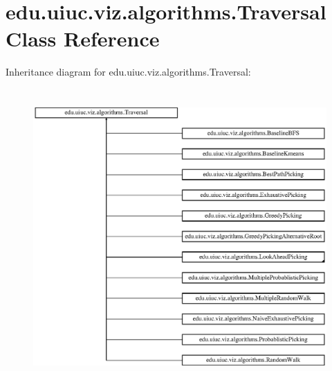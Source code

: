 \hypertarget{classedu_1_1uiuc_1_1viz_1_1algorithms_1_1_traversal}{}\section{edu.\+uiuc.\+viz.\+algorithms.\+Traversal Class Reference}
\label{classedu_1_1uiuc_1_1viz_1_1algorithms_1_1_traversal}
Inheritance diagram for edu.\+uiuc.\+viz.\+algorithms.\+Traversal\+:\begin{figure}[H]
\begin{center}
\leavevmode
\includegraphics[height=11.269350cm]{classedu_1_1uiuc_1_1viz_1_1algorithms_1_1_traversal}
\end{center}
\end{figure}
